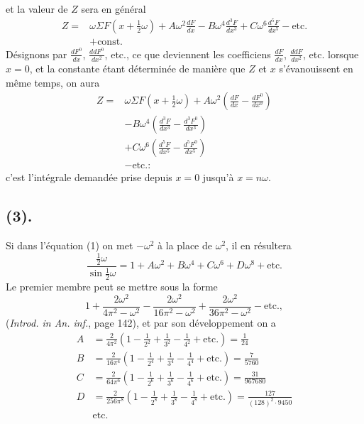\documentclass{article}
\begin{document}
et la valeur de $Z$ sera en général
\[ \begin{aligned} Z={}&\omega\Sigma F(x+\tfrac{1}{2}\omega)+A\omega^{2}\frac{dF}{dx}-B\omega^{4}\frac{d^{3}F}{dx^{3}}+C\omega^{6}\frac{d^{5}F}{dx^{5}}-\text{etc.}\\ &+\text{const.} \end{aligned} \]
Désignons par $\frac{dF^{0}}{dx}$, $\frac{ddF^{0}}{dx^{2}}$, etc., ce que deviennent les coefficiens $\frac{dF}{dx}$, $\frac{ddF}{dx^{2}}$, etc. lorsque $x=0$, et la constante étant déterminée de manière que $Z$ et $x$ s'évanouissent en même temps, on aura
\[ \begin{aligned} Z={}&\omega\Sigma F(x+\tfrac{1}{2}\omega)+A\omega^{2}\left(\frac{dF}{dx}-\frac{dF^{0}}{dx^{0}}\right)\\ &-B\omega^{4}\left(\frac{d^{3}F}{dx^{3}}-\frac{d^{3}F^{0}}{dx^{3}}\right)\\ &+C\omega^{6}\left(\frac{d^{5}F}{dx^{5}}-\frac{d^{5}F^{0}}{dx^{5}}\right)\\ &-\text{etc.}: \end{aligned} \tag{2} \]
c'est l'intégrale demandée prise depuis $x=0$ jusqu'à $x=n\omega$.

\subsection*{(3).}

Si dans l'équation (1) on met $-\omega^{2}$ à la place de $\omega^{2}$, il en résultera
\[ \frac{\tfrac{1}{2}\omega}{\sin\tfrac{1}{2}\omega}=1+A\omega^{2}+B\omega^{4}+C\omega^{6}+D\omega^{8}+\text{etc.} \]
Le premier membre peut se mettre sous la forme
\[ 1+\frac{2\omega^{2}}{4\pi^{2}-\omega^{2}}-\frac{2\omega^{2}}{16\pi^{2}-\omega^{2}}+\frac{2\omega^{2}}{36\pi^{2}-\omega^{2}}-\text{etc.}, \]
(\emph{Introd. in An. inf.}, page 142), et par son développement on a
\[ \begin{aligned} A&=\frac{2}{4\pi^{2}}\left(1-\frac{1}{2^{2}}+\frac{1}{3^{2}}-\frac{1}{4^{2}}+\text{etc.}\right)=\frac{1}{24}\\ B&=\frac{2}{16\pi^{4}}\left(1-\frac{1}{2^{4}}+\frac{1}{3^{4}}-\frac{1}{4^{4}}+\text{etc.}\right)=\frac{7}{5760}\\ C&=\frac{2}{64\pi^{6}}\left(1-\frac{1}{2^{6}}+\frac{1}{3^{6}}-\frac{1}{4^{6}}+\text{etc.}\right)=\frac{31}{967680}\\ D&=\frac{2}{256\pi^{8}}\left(1-\frac{1}{2^{8}}+\frac{1}{3^{8}}-\frac{1}{4^{8}}+\text{etc.}\right)=\frac{127}{(128)^{2}\cdot9450}\\ &\text{etc.} \end{aligned} \]
\end{document}
